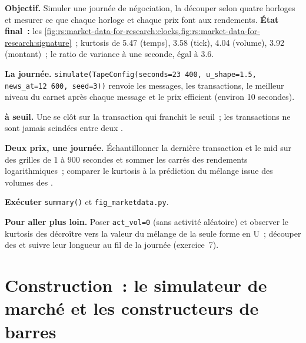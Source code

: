 \begin{tutorial}
\textbf{Objectif.} Simuler une journée de négociation, la découper selon quatre horloges et mesurer ce que chaque horloge et chaque prix font aux rendements.
\textbf{État final~:} les \cref{fig:rs:market-data-for-research:clocks,fig:rs:market-data-for-research:signature}~; kurtosis de 5.47 (temps),
3.58 (tick), 4.04 (volume), 3.92 (montant)~; le ratio de variance à une seconde, égal à 3.6.
\begin{tutsteps}
\item \textbf{La journée.} \texttt{simulate(TapeConfig(seconds=23\,400, u\_shape=1.5, news\_at=12\,600, seed=3))} renvoie les
messages, les transactions, le meilleur niveau du carnet après chaque message et le prix efficient (environ 10 secondes).
\item \textbf{ à seuil.} Une  se clôt sur la transaction qui franchit le seuil~; les transactions ne sont jamais scindées entre deux .
\label{lst:rs:market-data-for-research:cuts}
\item \textbf{Deux prix, une journée.} Échantillonner la dernière transaction et le mid sur des grilles de 1 à 900 secondes et sommer les carrés
des rendements logarithmiques~; comparer le kurtosis à la prédiction du mélange issue des volumes des .
\label{lst:rs:market-data-for-research:rv}
\item \textbf{Exécuter} \texttt{summary()} et \texttt{fig\_marketdata.py}.
\end{tutsteps}
\textbf{Pour aller plus loin.} Poser \texttt{act\_vol=0} (sans activité aléatoire) et observer le kurtosis des  décroître vers la
valeur du mélange de la seule forme en U~; découper des  et suivre leur longueur au fil de la journée (exercice~7).
\end{tutorial}

\section{Construction~: le simulateur de marché et les constructeurs de barres}\label{bld:rs:market-data-for-research:tape}

